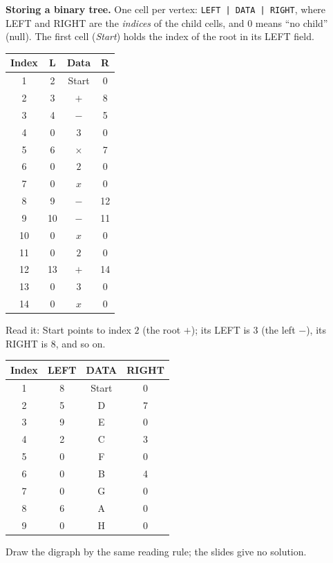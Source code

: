 \documentclass{fkt-notes}
\theoremstyle{definition}
\begin{document}
\textbf{Storing a binary tree.} One cell per vertex: \texttt{LEFT |
  DATA | RIGHT}, where LEFT and RIGHT are the \emph{indices} of the child
cells, and $0$ means ``no child'' (null). The first cell (\emph{Start})
holds the index of the root in its LEFT field.

\begin{example}
  \leavevmode\par\noindent
  \begin{center}\small
    \begin{tabular}{@{}c|ccc@{}}
      Index & L  & Data     & R  \\\hline
      1     & 2  & Start    & 0  \\ 2 & 3 & $+$ & 8\\ 3 & 4 & $-$ & 5\\ 4 & 0 & $3$ & 0\\
      5     & 6  & $\times$ & 7  \\ 6 & 0 & $2$ & 0\\ 7 & 0 & $x$ & 0\\ 8 & 9 & $-$ & 12\\
      9     & 10 & $-$      & 11 \\ 10 & 0 & $x$ & 0\\ 11 & 0 & $2$ & 0\\ 12 & 13 & $+$ & 14\\
      13    & 0  & $3$      & 0  \\ 14 & 0 & $x$ & 0
    \end{tabular}
  \end{center}
  Read it: Start points to index $2$ (the root $+$); its LEFT is $3$
  (the left $-$), its RIGHT is $8$, and so on.
\end{example}
\begin{example}
  \leavevmode\par\noindent
  \begin{center}\small
    \begin{tabular}{@{}c|ccc@{}}
      Index & LEFT & DATA  & RIGHT \\\hline
      1     & 8    & Start & 0     \\ 2 & 5 & D & 7\\ 3 & 9 & E & 0\\ 4 & 2 & C & 3\\
      5     & 0    & F     & 0     \\ 6 & 0 & B & 4\\ 7 & 0 & G & 0\\ 8 & 6 & A & 0\\ 9 & 0 & H & 0
    \end{tabular}
  \end{center}
  Draw the digraph by the same reading rule; the slides give no solution.
\end{example}
\end{document}
